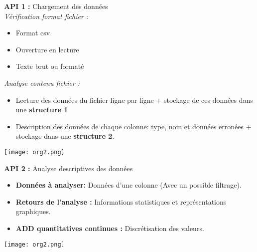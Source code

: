 	\begin{frame}
		\textbf{API 1 :} Chargement des données\\
		\textit{Vérification format fichier :}
		\begin{itemize}
			\item Format csv
			\item Ouverture en lecture
			\item Texte brut ou formaté
		\end{itemize} \pause
		\vspace{1cm}
		\textit{Analyse contenu fichier :}
		\begin{itemize}
			\item Lecture des données du fichier ligne par ligne + stockage de ces données dans une \textbf{structure 1} 
			\item Description des données de chaque colonne: type, nom et données erronées + stockage dans une \textbf{structure 2}.
		\end{itemize}		 		
	\end{frame}
	
	\begin{frame}
		\begin{center}\texttt{[image: org2.png]}\end{center}
	\end{frame}
	
	\begin{frame}
		\textbf{API 2 :} Analyse descriptives des données\\
		\begin{itemize}
			\item \textbf{Données à analyser:} Données d'une colonne (Avec un possible filtrage).
			\item \textbf{Retours de l'analyse :} Informations statistiques et représentations graphiques.
			\item \textbf{ADD quantitatives continues :} Discrétisation des valeurs.
		\end{itemize}	
	\end{frame}
	
	\begin{frame}
		\begin{center}\texttt{[image: org2.png]}\end{center}
	\end{frame}
	
